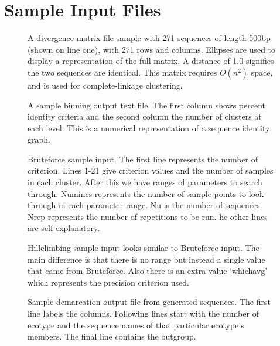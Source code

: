 \chapter{Sample Input Files}

\begin{figure}[h!]
\centering
\noindent{}
\caption[Divergence matrix sample text file.]{A divergence matrix file sample with 271 sequences of length 500bp (shown on line one), with 271 rows and columns. Ellipses are used to display a representation of the full matrix. A distance of 1.0 signifies the two sequences are identical. This matrix requires $O(n^2)$ space, and is used for complete-linkage clustering.}
\label{code:DivergenceMatrix}
\end{figure}

\begin{figure}[h!]
\centering
\noindent{}
\caption[Binning sample output.]{A sample binning output text file. The first column shows percent identity criteria and the second column the number of clusters at each level. This is a numerical representation of a sequence identity graph.}
\label{code:Binning}
\end{figure}

\begin{figure}[h!]
\centering
\noindent{}
\caption[Bruteforce sample input.]{Bruteforce sample input.
The first line represents the number of criterion.
Lines 1-21 give criterion values and the number of samples in each cluster.
After this we have ranges of parameters to search through.
Numincs represents the number of sample points to look through in each parameter range.
Nu is the number of sequences.
Nrep represents the number of repetitions to be run. 
he other lines are self-explanatory.}
\label{code:Bruteforce}
\end{figure}

\begin{figure}[h!]
\centering
\noindent{}
\caption[Hillclimbing sample input.]{Hillclimbing sample input looks similar to Bruteforce input. The main difference is that there is no range but instead a single value that came from Bruteforce. Also there is an extra value `whichavg' which represents the precision criterion used.}
\label{code:Hillclimbing}
\end{figure}

\begin{figure}[h!]
\centering
\noindent{}
\caption[Sample demarcation output file from generated sequences.]{Sample demarcation output file from generated sequences.
The first line labels the columns.
Following lines start with the number of ecotype and the sequence names of that particular ecotype's members.
The final line contains the outgroup.}
\label{code:DemarcationFormat}
\end{figure}
